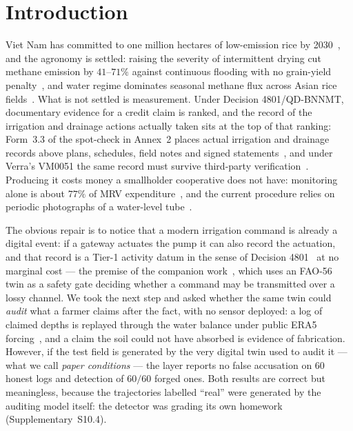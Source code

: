 \section{Introduction}
\label{sec:intro}

Viet Nam has committed to one million hectares of low-emission rice by 2030~\cite{qd1490}, and
the agronomy is settled: raising the severity of intermittent drying cut methane
emission by $41$--$71\%$ against continuous flooding with no grain-yield
penalty~\cite{balaine2019}, and water regime dominates seasonal methane flux
across Asian rice fields~\cite{yan2005}. What is not settled is measurement. Under Decision 4801/QD-BNNMT, documentary evidence for a
credit claim is ranked, and the record of the irrigation and drainage actions
actually taken sits at the top of that ranking: Form~3.3 of the spot-check in
Annex~2 places actual irrigation and drainage records above plans, schedules,
field notes and signed statements~\cite{qd4801}, and under Verra's VM0051 the same record must survive
third-party verification~\cite{vm0051}. Producing it costs money a smallholder
cooperative does not have: monitoring alone is about $77\%$ of MRV
expenditure~\cite{jem2026mrv}, and the current procedure relies on periodic
photographs of a water-level tube~\cite{qd4801}.

The obvious repair is to notice that a modern irrigation command is already a
digital event: if a gateway actuates the pump it can also record the actuation,
and that record is a Tier-1 activity datum in the sense of Decision
4801~\cite{qd4801} at no marginal cost --- the premise of the companion work~\cite{twingate2026}, which
uses an FAO-56 twin as a safety gate deciding whether a command may be
transmitted over a lossy channel. We took the next step and asked whether the
same twin could \emph{audit} what a farmer claims after the fact, with no
sensor deployed: a log of claimed depths is replayed through the water balance
under public ERA5 forcing~\cite{hersbach2020}, and a claim the soil could not have absorbed is
evidence of fabrication. However, if the test field is generated by the very digital twin used to audit it --- what we call \emph{paper conditions} --- the layer reports no false accusation on $60$ honest logs and detection of $60/60$ forged ones. Both results are correct but meaningless, because the trajectories labelled ``real'' were generated by the auditing model itself: the detector was grading its own homework (Supplementary~S10.4).

